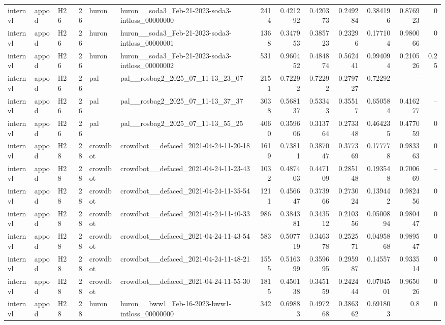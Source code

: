 \begin{longtable}{lllrllrrrrrrr}
internvl & appod & H26 & 26 & huron & huron\_\_soda3\_Feb-21-2023-soda3-intloss\_00000000 & 2414 & 0.421292 & 0.420373 & 0.249284 & 0.384196 & 0.876923 & 0 \\
internvl & appod & H26 & 26 & huron & huron\_\_soda3\_Feb-21-2023-soda3-intloss\_00000001 & 1368 & 0.347953 & 0.385723 & 0.23296 & 0.177104 & 0.980066 & 0 \\
internvl & appod & H26 & 26 & huron & huron\_\_soda3\_Feb-21-2023-soda3-intloss\_00000002 & 531 & 0.960452 & 0.484874 & 0.562441 & 0.994094 & 0.210526 & 0.25 \\
internvl & appod & H26 & 26 & pal & pal\_\_rosbag2\_2025\_07\_11-13\_23\_07 & 2151 & 0.72292 & 0.72292 & 0.279727 & 0.72292 & -- & -- \\
internvl & appod & H26 & 26 & pal & pal\_\_rosbag2\_2025\_07\_11-13\_37\_37 & 3038 & 0.568137 & 0.53343 & 0.35517 & 0.650584 & 0.416277 & -- \\
internvl & appod & H26 & 26 & pal & pal\_\_rosbag2\_2025\_07\_11-13\_55\_25 & 4060 & 0.359606 & 0.313764 & 0.273348 & 0.464235 & 0.477059 & 0 \\
internvl & appod & H28 & 28 & crowdbot & crowdbot\_\_defaced\_2021-04-24-11-20-18 & 1619 & 0.73811 & 0.387047 & 0.377369 & 0.177778 & 0.983363 & 0 \\
internvl & appod & H28 & 28 & crowdbot & crowdbot\_\_defaced\_2021-04-24-11-23-43 & 1032 & 0.487403 & 0.447109 & 0.285148 & 0.193548 & 0.700669 & -- \\
internvl & appod & H28 & 28 & crowdbot & crowdbot\_\_defaced\_2021-04-24-11-35-54 & 1211 & 0.456647 & 0.373966 & 0.273024 & 0.139442 & 0.982456 & 0 \\
internvl & appod & H28 & 28 & crowdbot & crowdbot\_\_defaced\_2021-04-24-11-40-33 & 986 & 0.384381 & 0.343512 & 0.210356 & 0.0500894 & 0.980447 & 0 \\
internvl & appod & H28 & 28 & crowdbot & crowdbot\_\_defaced\_2021-04-24-11-43-54 & 583 & 0.507719 & 0.346378 & 0.252571 & 0.0495868 & 0.989547 & 0 \\
internvl & appod & H28 & 28 & crowdbot & crowdbot\_\_defaced\_2021-04-24-11-48-21 & 1555 & 0.516399 & 0.359695 & 0.295987 & 0.14557 & 0.933514 & 0 \\
internvl & appod & H28 & 28 & crowdbot & crowdbot\_\_defaced\_2021-04-24-11-55-30 & 1815 & 0.450138 & 0.345159 & 0.242444 & 0.0704501 & 0.965026 & 0 \\
internvl & appod & H28 & 28 & huron & huron\_\_bww1\_Feb-16-2023-bww1-intloss\_00000000 & 342 & 0.69883 & 0.497268 & 0.386362 & 0.691803 & 0.8 & 0 \\

\end{longtable}
